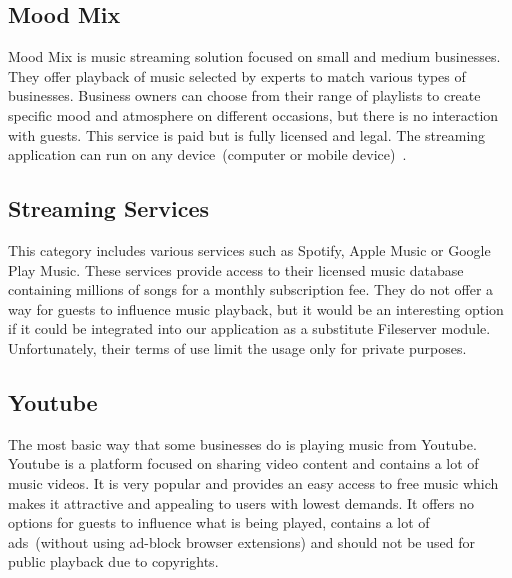 \subsection{Mood Mix}

Mood Mix is music streaming solution focused on small and medium businesses. They offer playback of music selected by experts to match various types of businesses. Business owners can choose from their range of playlists to create specific mood and atmosphere on different occasions, but there is no interaction with guests. This service is paid but is fully licensed and legal. The streaming application can run on any device~(computer or mobile device)~\citep{moodmix}.

\subsection{Streaming Services}

This category includes various services such as Spotify, Apple Music or Google Play Music. These services provide access to their licensed music database containing millions of songs for a monthly subscription fee. They do not offer a way for guests to influence music playback, but it would be an interesting option if it could be integrated into our application as a substitute Fileserver module. Unfortunately, their terms of use limit the usage only for private purposes.

\subsection{Youtube}

The most basic way that some businesses do is playing music from Youtube. Youtube is a platform focused on sharing video content and contains a lot of music videos. It is very popular and provides an easy access to free music which makes it attractive and appealing to users with lowest demands. It offers no options for guests to influence what is being played, contains a lot of ads~(without using ad-block browser extensions) and should not be used for public playback due to copyrights.


